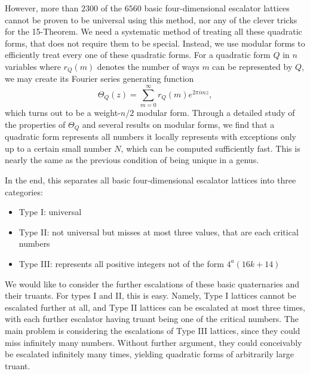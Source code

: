\documentclass[letterpaper, 12pt]{article}
\begin{document}
However, more than $2300$ of the $6560$ basic four-dimensional escalator lattices cannot be proven to be universal using this method, nor any of the clever tricks for the 15-Theorem. We need a systematic method of treating all these quadratic forms, that does not require them to be special.
Instead, we use modular forms to efficiently treat every one of these quadratic forms. For a quadratic form $Q$ in $n$ variables where $r_Q(m)$ denotes the number of ways $m$ can be represented by $Q$, we may create its Fourier series generating function
\[\Theta_Q(z) = \sum_{m = 0}^{\infty} r_Q(m) e^{2\pi i m z},\]
which turns out to be a weight-$n/2$ modular form. Through a detailed study of the properties of $\Theta_Q$ and several results on modular forms, we find that a quadratic form represents all numbers it locally represents with exceptions only up to a certain small number $N$, which can be computed sufficiently fast. This is nearly the same as the previous condition of being unique in a genus.

In the end, this separates all basic four-dimensional escalator lattices into three categories:
\begin{itemize}
    \item Type I: universal
    \item Type II: not universal but misses at most three values, that are each critical numbers
    \item Type III: represents all positive integers not of the form $4^a(16k+14)$
\end{itemize}
We would like to consider the further escalations of these basic quaternaries and their truants.
For types I and II, this is easy.
Namely, Type I lattices cannot be escalated further at all, and Type II lattices can be escalated at most three times, with each further escalator having truant being one of the critical numbers.
The main problem is considering the escalations of Type III lattices, since they could miss infinitely many numbers. Without further argument, they could conceivably be escalated infinitely many times, yielding quadratic forms of arbitrarily large truant.
\end{document}
